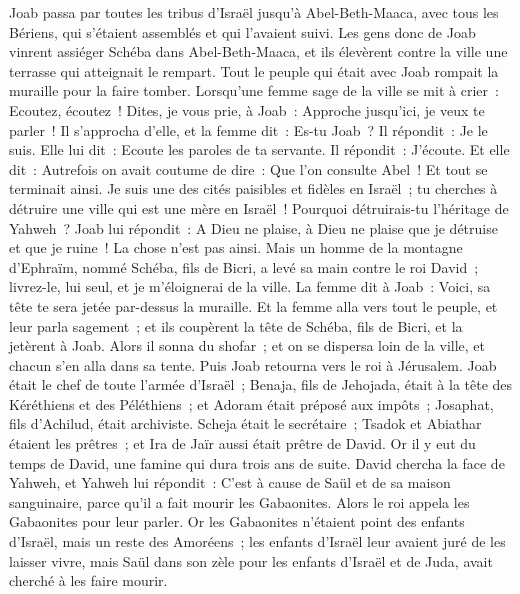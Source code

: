 \begin{multicols}{2}
Joab passa par toutes les tribus d'Israël jusqu'à Abel-Beth-Maaca, avec tous les Bériens, qui s'étaient assemblés et qui l'avaient suivi.
Les gens donc de Joab vinrent assiéger Schéba dans Abel-Beth-Maaca, et ils élevèrent contre la ville une terrasse qui atteignait le rempart. Tout le peuple qui était avec Joab rompait la muraille pour la faire tomber.
Lorsqu'une femme sage de la ville se mit à crier~: Ecoutez, écoutez~! Dites, je vous prie, à Joab~: Approche jusqu'ici, je veux te parler~!
Il s'approcha d'elle, et la femme dit~: Es-tu Joab~? Il répondit~: Je le suis. Elle lui dit~: Ecoute les paroles de ta servante. Il répondit~: J'écoute.
Et elle dit~: Autrefois on avait coutume de dire~: Que l'on consulte Abel~! Et tout se terminait ainsi.
Je suis une des cités paisibles et fidèles en Israël~; tu cherches à détruire une ville qui est une mère en Israël~! Pourquoi détruirais-tu l'héritage de Yahweh~?
Joab lui répondit~: A Dieu ne plaise, à Dieu ne plaise que je détruise et que je ruine~!
La chose n'est pas ainsi. Mais un homme de la montagne d'Ephraïm, nommé Schéba, fils de Bicri, a levé sa main contre le roi David~; livrez-le, lui seul, et je m'éloignerai de la ville. La femme dit à Joab~: Voici, sa tête te sera jetée par-dessus la muraille.
Et la femme alla vers tout le peuple, et leur parla sagement~; et ils coupèrent la tête de Schéba, fils de Bicri, et la jetèrent à Joab. Alors il sonna du shofar~; et on se dispersa loin de la ville, et chacun s'en alla dans sa tente. Puis Joab retourna vers le roi à Jérusalem.
Joab était le chef de toute l'armée d'Israël~; Benaja, fils de Jehojada, était à la tête des Kéréthiens et des Péléthiens~;
et Adoram était préposé aux impôts~; Josaphat, fils d'Achilud, était archiviste.
Scheja était le secrétaire~; Tsadok et Abiathar étaient les prêtres~;
et Ira de Jaïr aussi était prêtre de David.
\VerseOne{}Or il y eut du temps de David, une famine qui dura trois ans de suite. David chercha la face de Yahweh, et Yahweh lui répondit~: C'est à cause de Saül et de sa maison sanguinaire, parce qu'il a fait mourir les Gabaonites.
Alors le roi appela les Gabaonites pour leur parler. Or les Gabaonites n'étaient point des enfants d'Israël, mais un reste des Amoréens~; les enfants d'Israël leur avaient juré de les laisser vivre, mais Saül dans son zèle pour les enfants d'Israël et de Juda, avait cherché à les faire mourir.

\end{multicols}
